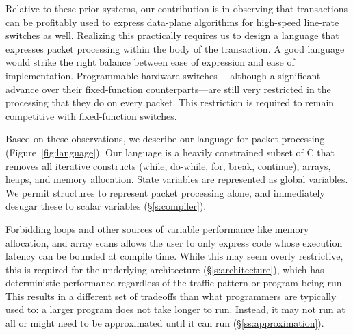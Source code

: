 Relative to these prior systems, our contribution is in observing that
transactions can be profitably used to express data-plane algorithms for
high-speed line-rate switches as well. Realizing this practically requires us
to design a language that expresses packet processing within the body of the
transaction. A good language would strike the right balance between ease of
expression and ease of implementation. Programmable hardware switches
---although a significant advance over their fixed-function counterparts---are
still very restricted in the processing that they do on every packet. This
restriction is required to remain competitive with fixed-function switches.

Based on these observations, we describe our language for packet processing
(Figure~\ref{fig:language}). Our language is a heavily constrained subset of C
that removes all iterative constructs (while, do-while, for, break, continue),
arrays, heaps, and memory allocation. State variables are represented as global
variables. We permit structures to represent packet processing alone, and immediately
desugar these to scalar variables (\S\ref{s:compiler}).

Forbidding loops and other sources of variable performance like memory
allocation, and array scans allows the user to only express code whose
execution latency can be bounded at compile time.  While this may seem overly
restrictive, this is required for the underlying architecture
(\S\ref{s:architecture}), which has deterministic performance regardless of the
traffic pattern or program being run. This results in a different set of
tradeoffs than what programmers are typically used to: a larger program does
not take longer to run. Instead, it may not run at all or might need to be
approximated until it can run (\S\ref{ss:approximation}).
